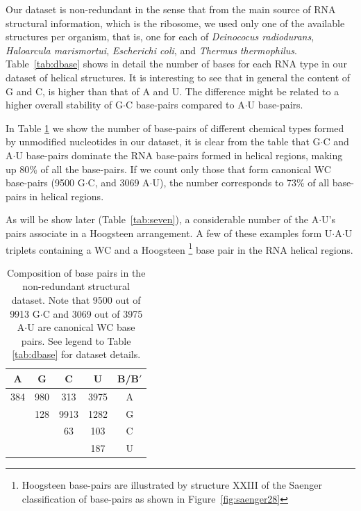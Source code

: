 Our dataset is non-redundant in the sense that from the main source of
RNA structural information, which is the ribosome, we used only one of
the  available structures  per  organism,  that is,  one  for each  of
\textit{Deinococus   radiodurans},   \textit{Haloarcula  marismortui},
\textit{Escherichi          coli},         and         \textit{Thermus
  thermophilus}. Table~\ref{tab:dbase}  shows in detail  the number of
bases for each  RNA type in our dataset of  helical structures.  It is
interesting to see  that in general the content of G  and C, is higher
than that  of A  and U. The  difference might  be related to  a higher
overall  stability  of  G$\cdot$C  base-pairs  compared  to  A$\cdot$U
base-pairs.

In  Table  \ref{tab:bpcomp}  we  show  the  number  of  base-pairs  of
different  chemical  types formed  by  unmodified  nucleotides in  our
dataset,  it is  clear from  the  table that  G$\cdot$C and  A$\cdot$U
base-pairs  dominate the  RNA  base-pairs formed  in helical  regions,
making up 80\% of all the base-pairs. If we count only those that form
canonical  WC base-pairs  (9500  G$\cdot$C, and  3069 A$\cdot$U),  the
number corresponds to 73\% of all base-pairs in helical regions.

As will  be show later (Table~\ref{tab:seven}),  a considerable number
of the A$\cdot$U's  pairs associate in a Hoogsteen  arrangement. A few
of these examples form  U$\cdot$A$\cdot$U triplets containing a WC and
a   Hoogsteen  \footnote{Hoogsteen   base-pairs  are   illustrated  by
  structure XXIII of the Saenger classification of base-pairs as shown
  in Figure~\ref{fig:saenger28}} base pair in the RNA helical regions.

\begin{table}[htbp]
\begin{center}
\begin{tabular}{|c|c|c|c|c|}
\hline
A    &      G    &      C    &      U    &      B/B$'$ \\ \hline
384  &    980    &    313    &   3975    &      A  \\ \hline
     &    128    &   9913    &   1282    &      G  \\ \hline
     &           &     63    &    103    &      C  \\ \hline
     &           &           &    187    &      U  \\ \hline
\end{tabular}
\caption{Composition  of base  pairs in  the  non-redundant structural
  dataset. Note that 9500 out of 9913 G$\cdot$C and 3069
  out of  3975 A$\cdot$U  are canonical WC  base pairs. See  legend to
  Table \ref{tab:dbase} for dataset details.}
\label{tab:bpcomp}
\end{center}
\end{table}

